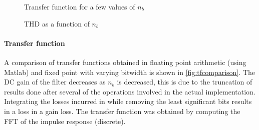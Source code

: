 \begin{figure}[htbp]
	\centering
	\caption{Transfer function for a few values of $n_b$}
	\label{fig:tfcomparison}
\end{figure}
\begin{figure}[htbp]
	\centering
	\caption{THD as a function of $n_b$}
	\label{fig:thdplot}
\end{figure}

\paragraph{Transfer function} A comparison of transfer functions obtained in floating point arithmetic (using Matlab) and fixed point with varying bitwidth is shown in \autoref{fig:tfcomparison}. The DC gain of the filter decreases as $n_b$ is decreased, this is due to the truncation of results done after several of the operations involved in the actual implementation. Integrating the losses incurred in while removing the least significant bits results in a loss in a gain loss. The transfer function was obtained by computing the FFT of the impulse response (discrete).